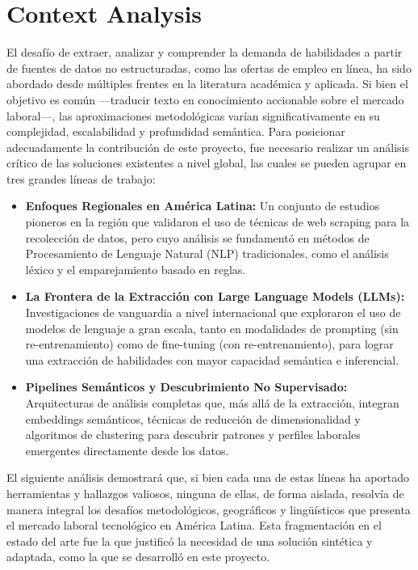 \section{Context Analysis}

El desafío de extraer, analizar y comprender la demanda de habilidades a partir de fuentes de datos no estructuradas, como las ofertas de empleo en línea, ha sido abordado desde múltiples frentes en la literatura académica y aplicada. Si bien el objetivo es común ---traducir texto en conocimiento accionable sobre el mercado laboral---, las aproximaciones metodológicas varían significativamente en su complejidad, escalabilidad y profundidad semántica. Para posicionar adecuadamente la contribución de este proyecto, fue necesario realizar un análisis crítico de las soluciones existentes a nivel global, las cuales se pueden agrupar en tres grandes líneas de trabajo:

\begin{itemize}
    \item \textbf{Enfoques Regionales en América Latina:} Un conjunto de estudios pioneros en la región que validaron el uso de técnicas de web scraping para la recolección de datos, pero cuyo análisis se fundamentó en métodos de Procesamiento de Lenguaje Natural (NLP) tradicionales, como el análisis léxico y el emparejamiento basado en reglas.

    \item \textbf{La Frontera de la Extracción con Large Language Models (LLMs):} Investigaciones de vanguardia a nivel internacional que exploraron el uso de modelos de lenguaje a gran escala, tanto en modalidades de prompting (sin re-entrenamiento) como de fine-tuning (con re-entrenamiento), para lograr una extracción de habilidades con mayor capacidad semántica e inferencial.

    \item \textbf{Pipelines Semánticos y Descubrimiento No Supervisado:} Arquitecturas de análisis completas que, más allá de la extracción, integran embeddings semánticos, técnicas de reducción de dimensionalidad y algoritmos de clustering para descubrir patrones y perfiles laborales emergentes directamente desde los datos.
\end{itemize}

El siguiente análisis demostrará que, si bien cada una de estas líneas ha aportado herramientas y hallazgos valiosos, ninguna de ellas, de forma aislada, resolvía de manera integral los desafíos metodológicos, geográficos y lingüísticos que presenta el mercado laboral tecnológico en América Latina. Esta fragmentación en el estado del arte fue la que justificó la necesidad de una solución sintética y adaptada, como la que se desarrolló en este proyecto.

